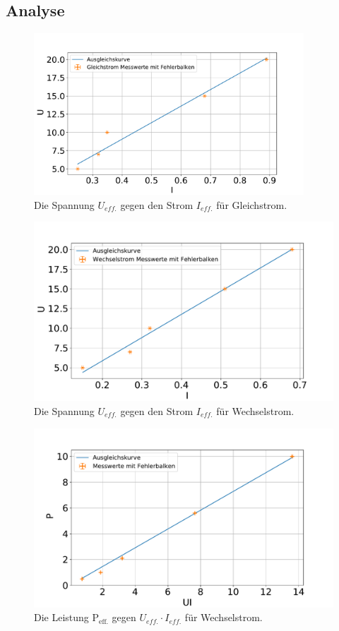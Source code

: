 \subsection{Analyse}
\begin{figure}[h]
	\centering
	\includegraphics[width=0.9\textwidth]{res/UgegenI_GL.pdf}
	\caption{Die Spannung $U_{eff.}$ gegen den Strom $I_{eff.}$ für Gleichstrom.}
	\label{fig:UgegenIgl}
\end{figure}
\begin{figure}[h]
	\centering
	\includegraphics[width=0.9\linewidth]{res/UgegenI_W.pdf}
	\caption{Die Spannung $U_{eff.}$ gegen den Strom $I_{eff.}$ für Wechselstrom.}
	\label{fig:UgegenIw}
\end{figure}
\begin{figure}[h]
	\centering
	\includegraphics[width=0.9\linewidth]{res/PgegenUI.pdf}
	\caption{Die Leistung P$_\text{eff.}$ gegen $U_{eff.} \cdot I_{eff.}$ für Wechselstrom.}
	\label{fig:PgegenUI}
\end{figure}

